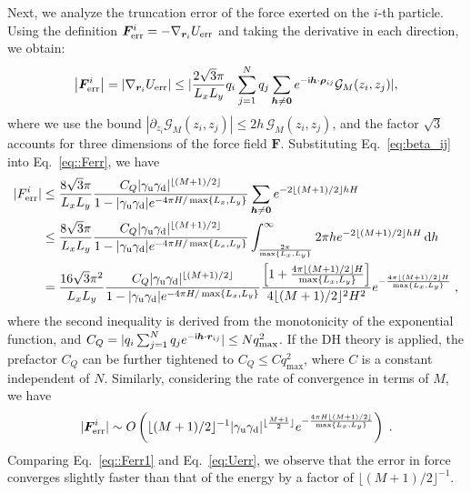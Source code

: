 Next, we analyze the truncation error of the force exerted on the $i$-th particle. Using the definition $\bm{F}^i_{\text{err}}=-\nabla_{\bm{r}_i} U_{\text{err}}$ and taking the derivative in each direction, we obtain:
\begin{equation}\label{eq::Ferr}
    \left|\bm{F}^i_{\text{err}}\right| = \left|\nabla_{\bm{r}_i} U_{\text{err}}\right|\leq  \lvert\frac{2\sqrt{3}\pi}{L_xL_y} q_i \sum_{j=1}^{N} q_j\sum_{\bm{h}\neq \bm{0}} e^{-\mathsf i \bm{h}\cdot\bm{\rho}_{ij}}\mathcal{G}_{M}(z_i,z_j)\rvert, 
\end{equation}
where we use the bound $\left|\partial_{z_i}\mathcal{G}_M(z_{i},z_{j})\right|\leq 2h\,\mathcal{G}_{M}(z_i,z_j)$, and the factor $\sqrt{3}$ accounts for three dimensions of the force field $\bm F$.  
Substituting Eq.~\eqref{eq:beta_ij} into Eq.~\eqref{eq::Ferr}, we have 
\begin{equation}
\begin{split}
 |F^{i}_{\text{err}}| %
 & \leq \frac{8\sqrt{3}\pi}{L_xL_y}  \frac{C_{Q} \abs{\gamma_{\T u} \gamma_{\T d}}^{\lfloor{(M+1)/2}\rfloor}}{1 - \abs{\gamma_{\T u} \gamma_{\T d}} e^{- 4\pi H / \max\{L_x,L_y\}}} \sum_{\bm{h}\neq \bm{0}} e^{- 2 \lfloor{(M+1)/2}\rfloor hH}\\
 & \leq \frac{8\sqrt{3}\pi}{L_xL_y} \frac{ C_Q\abs{\gamma_{\T u} \gamma_{\T d}}^{\lfloor{(M+1)/2}\rfloor}}{1 - \abs{\gamma_{\T u} \gamma_{\T d}} e^{- 4\pi H / \max\{L_x,L_y\}}} \int_{\frac{2\pi}{\max\{L_x,L_y\}}}^{\infty} 2\pi h e^{- 2 \lfloor{(M+1)/2}\rfloor hH} \, \mathrm{d}h \\
& = \frac{16\sqrt{3} \pi^2}{L_xL_y} \frac{C_Q \abs{\gamma_{\T u} \gamma_{\T d}}^{\lfloor{(M+1)/2}\rfloor}}{1 - \abs{\gamma_{\T u} \gamma_{\T d}} e^{- 4\pi H / \max\{L_x,L_y\}}}  \frac{\left[1 + \frac{4\pi \lfloor{(M+1)/2}\rfloor H}{\max\{L_x,L_y\}}\right]}{4 \lfloor{(M+1)/2}\rfloor^2 H^2} e^{- \frac{4\pi \lfloor{(M+1)/2}\rfloor H}{\max\{L_x,L_y\}}}\;,
\end{split}
\end{equation}
where the second inequality is derived from the monotonicity of the exponential function, and $C_Q=|q_{i}\sum_{j=1}^{N}q_je^{-\mathsf i\bm{h}\cdot \bm{r}_{ij}}|\leq Nq_{\text{max}}^2$. 
If the DH theory is applied, the prefactor $C_Q$ can be further tightened to $C_Q\leq Cq_{\max}^2$, where $C$ is a constant independent of $N$. 
Similarly, considering the rate of convergence in terms of $M$, we have
\begin{equation}\label{eq::Ferr1}
|\bm{F}^i_{\text{err}}| \sim O\left(\lfloor (M+1)/2\rfloor^{-1}\lvert\gamma_{\text{u}} \gamma_{\text{d}}\rvert^{\lfloor\frac{M+1}{2}\rfloor} e^{-\frac{4\pi H \lfloor(M+1)/2\rfloor}{\max\{L_x,L_y\}}}\right)\;.
\end{equation}
Comparing Eq.~\eqref{eq::Ferr1} and Eq.~\eqref{eq:Uerr},
we observe that the error in force converges slightly faster than that of the energy by a factor of $\lfloor (M+1)/2\rfloor^{-1}$. 

